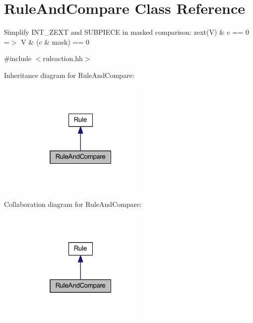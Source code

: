\hypertarget{class_rule_and_compare}{}\section{Rule\+And\+Compare Class Reference}
\label{class_rule_and_compare}


Simplify I\+N\+T\+\_\+\+Z\+E\+XT and S\+U\+B\+P\+I\+E\+CE in masked comparison\+: {\ttfamily zext(\+V) \& c == 0 =$>$ V \& (c \& mask) == 0}  




{\ttfamily \#include $<$ruleaction.\+hh$>$}



Inheritance diagram for Rule\+And\+Compare\+:
\nopagebreak
\begin{figure}[H]
\begin{center}
\leavevmode
\includegraphics[width=172pt]{class_rule_and_compare__inherit__graph}
\end{center}
\end{figure}


Collaboration diagram for Rule\+And\+Compare\+:
\nopagebreak
\begin{figure}[H]
\begin{center}
\leavevmode
\includegraphics[width=172pt]{class_rule_and_compare__coll__graph}
\end{center}
\end{figure}
